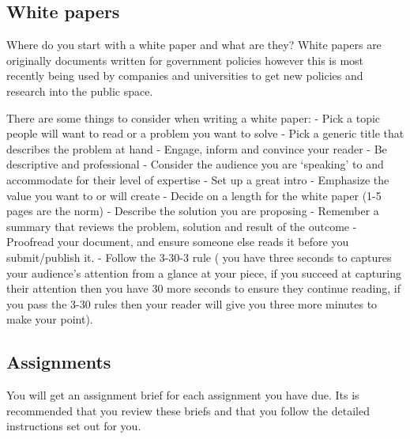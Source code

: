 \documentclass[]{book}
\theoremstyle{definition}
\theoremstyle{definition}
\theoremstyle{remark}
\begin{document}
\subsection{White papers}\label{white-papers}

Where do you start with a white paper and what are they? White papers
are originally documents written for government policies however this is
most recently being used by companies and universities to get new
policies and research into the public space.

There are some things to consider when writing a white paper: - Pick a
topic people will want to read or a problem you want to solve - Pick a
generic title that describes the problem at hand - Engage, inform and
convince your reader - Be descriptive and professional - Consider the
audience you are `speaking' to and accommodate for their level of
expertise - Set up a great intro - Emphasize the value you want to or
will create - Decide on a length for the white paper (1-5 pages are the
norm) - Describe the solution you are proposing - Remember a summary
that reviews the problem, solution and result of the outcome - Proofread
your document, and ensure someone else reads it before you
submit/publish it. - Follow the 3-30-3 rule ( you have three seconds to
captures your audience's attention from a glance at your piece, if you
succeed at capturing their attention then you have 30 more seconds to
ensure they continue reading, if you pass the 3-30 rules then your
reader will give you three more minutes to make your point).

\subsection{Assignments}\label{assignments}

You will get an assignment brief for each assignment you have due. Its
is recommended that you review these briefs and that you follow the
detailed instructions set out for you.


\end{document}
